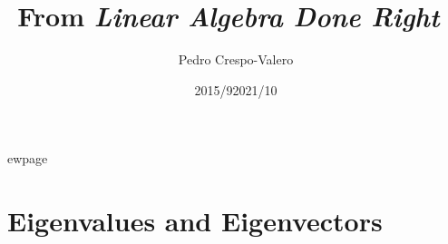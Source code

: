 \documentclass[11pt,notitlepage,oneside]{article}
\author{Pedro Crespo-Valero}
\begin{document}
\title{From \emph{Linear Algebra Done Right}~\cite{Axler1997}}
\date{2015/9}
\date{2021/10}
\maketitle

\tableofcontents

\newpage
\setcounter{section}{0}







ewpage
\section{Eigenvalues and Eigenvectors}
\end{document}
